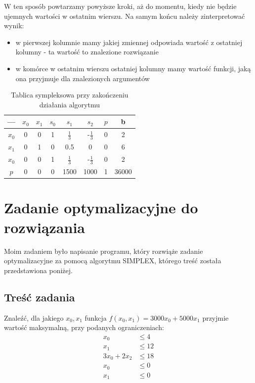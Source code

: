 \documentclass[10pt,a4paper]{article}
\begin{document}
W ten sposób powtarzamy powyższe kroki, aż do momentu, kiedy nie będzie ujemnych wartości
w ostatnim wierszu. Na samym końcu należy zinterpretować wynik:
\begin{itemize}
\item w pierwszej kolumnie mamy jakiej zmiennej odpowiada wartość z ostatniej kolumny - ta 
wartość to znalezione rozwiązanie
\item w komórce w ostatnim wierszu ostatniej kolumny mamy wartość funkcji, jaką ona przyjmuje
dla znalezionych argumentów
\end{itemize}
\begin{table}[ht]
\centering
\begin{tabular}{|c|c|c|c|c|c|c|c|}
\hline
 ---& $x_0$ & $x_1$ & $s_0$ & $s_1$ & $s_2$ & $p$ & b\\
\hline
$x_0$ & 0 & 0 & 1 & $\frac{1}{3}$ & -$\frac{1}{3}$ & 0 & 2\\
\hline
$x_1$ & 0 & 1 & 0 & 0.5 & 0 & 0 & 6\\
\hline 
$x_0$ & 0 & 0 & 1 & $\frac{1}{3}$ & -$\frac{1}{3}$ & 0 & 2\\
\hline
$p$ & 0 & 0 & 0 & 1500 & 1000 & 1 & 36000\\
\hline
\end{tabular}
\caption{Tablica sympleksowa przy zakończeniu działania algorytmu}
\end{table}

\section{Zadanie optymalizacyjne do rozwiązania}
Moim zadaniem było napisanie programu, który rozwiąże zadanie optymalizacyjne za pomocą 
algorytmu SIMPLEX, którego treść została przedstawiona poniżej.

\subsection{Treść zadania}
Znaleźć, dla jakiego $x_0,x_1$ funkcja $f(x_0,x_1)=3000x_0+5000x_1$ przyjmie wartość 
maksymalną, przy podanych ograniczeniach:
\begin{equation}
\begin{aligned}
x_0&\le 4\\
x_1&\le 12\\
3x_0+2x_2&\le 18\\
x_0&\le 0\\
x_1&\le 0
\end{aligned}
\end{equation}
\end{document}
